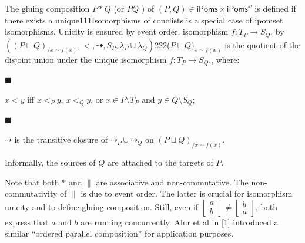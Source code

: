  
 
The gluing composition $P*Q$ (or $PQ$ ) of $(P,Q)\in\mathsf{iPoms}\times{\mathsf{iPoms}^{\omega}}$ is defined if there exists a unique111Isomorphisms of conclists is a special case of ipomset isomorphisms. Unicity is ensured by event order. isomorphism $f\colon T_{P}\to S_{Q}$, by $((P\sqcup Q)_{/x\sim f(x)},<,\dashrightarrow,S_{P},\lambda_{P}\cup\lambda_{Q})$222($P\sqcup Q)_{x\sim f(x)}$ is the quotient of the disjoint union under the unique isomorphism $f:T_{P}\to S_{Q}$., where:\par
  
\par\noindent  $\blacksquare$ 
 
$x<y$ iff $x<_{P}y$, $x<_{Q}y$, or $x\in P\setminus T_{P}$ and $y\in Q\setminus S_{Q}$;\par
 
 
 
\par\noindent  $\blacksquare$ 
 
$\dashrightarrow$ is the transitive closure of $\dashrightarrow_{P}\cup\dashrightarrow_{Q}$ on $(P\sqcup Q)_{/x\sim f(x)}$.\par
 
 
  
Informally, the sources of $Q$ are attached to the targets of $P$.\par
 
 
 
Note that both $*$ and $\parallel$ are associative and non-commutative. The non-commutativity of $\parallel$ is due to event order. The latter is crucial for isomorphism unicity and to define gluing composition. Still, even if $\left[\begin{smallmatrix}a\\
b\end{smallmatrix}\right]\neq\left[\begin{smallmatrix}b\\
a\end{smallmatrix}\right]$, both express that $a$ and $b$ are running concurrently. Alur et al in [1] introduced a similar “ordered parallel composition” for application purposes.\par
 
 
